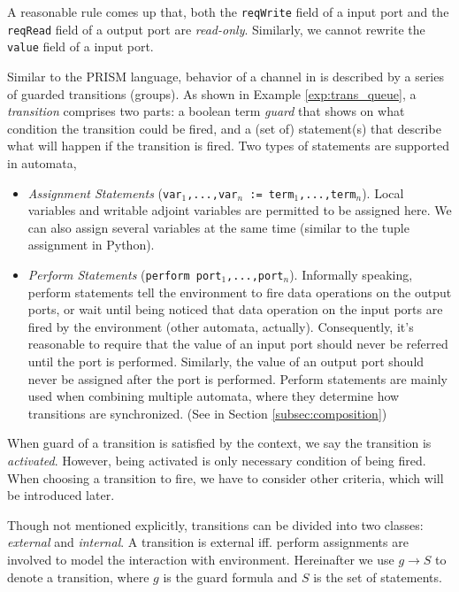 A reasonable rule comes up that, both the \texttt{reqWrite} field of a input port and the \texttt{reqRead} field of a output port are \emph{read-only}. Similarly, we cannot rewrite the \texttt{value} field of a input port.

 Similar to the PRISM\cite{KwiatkowskaCav2011} language, behavior of a channel in \lang{} is described by a series of guarded transitions (groups). As shown in  Example \ref{exp:trans_queue}, a \emph{transition} comprises two parts: a boolean term \emph{guard} that shows on what condition the transition could be fired, and a (set of) statement(s) that describe what will happen if the transition is fired. Two types of statements are supported in automata,
\begin{itemize}
    \item \emph{Assignment Statements} (\texttt{var$_1$,...,var$_n$ := term$_1$,...,term$_n$}). Local variables and writable adjoint variables are permitted to be assigned here. We can also assign several variables at the same time (similar to the tuple assignment in Python).
    \item \emph{Perform Statements} (\texttt{perform port$_1$,...,port$_n$}). Informally speaking, perform statements tell the environment to fire data operations on the output ports, or wait until being noticed that data operation on the input ports are fired by the environment (other automata, actually). Consequently, it's reasonable to require that the value of an input port should never be referred until the port is performed. Similarly, the value of an output port should never be assigned after the port is performed. Perform statements are mainly used when combining multiple automata, where they determine how transitions are synchronized. (See in Section \ref{subsec:composition})
\end{itemize}

When guard of a transition is satisfied by the context, we say the transition is \emph{activated}. However, being activated is only necessary condition of being fired. When choosing a transition to fire, we have to consider other criteria, which will be introduced later.

Though not mentioned explicitly, transitions can be divided into two classes: \emph{external} and \emph{internal}. A transition is external iff. perform assignments are involved to model the interaction with environment. Hereinafter we use $g\rightarrow S$ to denote a transition, where $g$ is the guard formula and $S$ is the set of statements.

